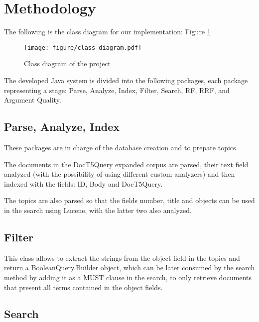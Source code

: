 \section{Methodology}
\label{sec:methodology}


The following is the class diagram for our implementation: Figure \ref{fig:class-diagram}

\begin{figure}[h]
	\centering
	\texttt{[image: figure/class-diagram.pdf]}
	\caption{Class diagram of the project}
	\label{fig:class-diagram}
\end{figure}

The developed Java system is divided into the following packages, each package representing a stage: Parse, Analyze, Index, Filter, Search, RF, RRF, and Argument Quality.

\subsection{Parse, Analyze, Index}
\label{subsec:parse, analyze, index}
  
  These packages are in charge of the database creation and to prepare topics.
  
  The documents in the DocT5Query expanded corpus are parsed, their text field analyzed (with the possibility of using different custom analyzers) and then indexed with the fields: ID, Body and DocT5Query.
  
  The topics are also parsed so that the fields number, title and objects can be used in the search using Lucene, with the latter two also analyzed.
 
\subsection{Filter}

This class allows to extract the strings from the object field in the topics and return a BooleanQuery.Builder object, which can be later consumed by the search method by adding it as a MUST clause in the search, to only retrieve documents that present all terms contained in the object fields.

\subsection{Search}
\label{subsec:search}
  
